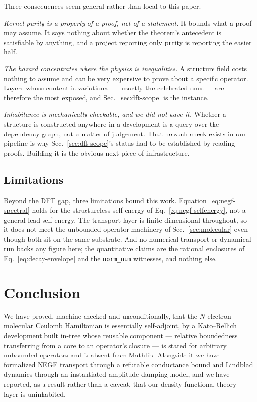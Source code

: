\documentclass[aps,prd,reprint,nofootinbib,superscriptaddress]{revtex4-2}
\begin{document}
Three consequences seem general rather than local to this paper.

\emph{Kernel purity is a property of a proof, not of a statement.} It bounds what a proof may assume.
It says nothing about whether the theorem's antecedent is satisfiable by anything, and a project
reporting only purity is reporting the easier half.

\emph{The hazard concentrates where the physics is inequalities.} A structure field costs nothing to
assume and can be very expensive to prove about a specific operator. Layers whose content is
variational --- exactly the celebrated ones --- are therefore the most exposed, and
Sec.~\ref{sec:dft-scope} is the instance.

\emph{Inhabitance is mechanically checkable, and we did not have it.} Whether a structure is
constructed anywhere in a development is a query over the dependency graph, not a matter of
judgement. That no such check exists in our pipeline is why Sec.~\ref{sec:dft-scope}'s status had to
be established by reading proofs. Building it is the obvious next piece of infrastructure.

\subsection{Limitations}

Beyond the DFT gap, three limitations bound this work. Equation~\eqref{eq:negf-spectral} holds for the
structureless self-energy of Eq.~\eqref{eq:negf-selfenergy}, not a general lead self-energy. The
transport layer is finite-dimensional throughout, so it does not meet the unbounded-operator
machinery of Sec.~\ref{sec:molecular} even though both sit on the same substrate. And no numerical
transport or dynamical run backs any figure here; the quantitative claims are the rational enclosures
of Eq.~\eqref{eq:decay-envelope} and the \texttt{norm\_num} witnesses, and nothing else.

\section{Conclusion}
\label{sec:conclusion}

We have proved, machine-checked and unconditionally, that the $N$-electron molecular Coulomb
Hamiltonian is essentially self-adjoint, by a Kato--Rellich development built in-tree whose reusable
component --- relative boundedness transferring from a core to an operator's closure --- is stated for
arbitrary unbounded operators and is absent from Mathlib. Alongside it we have formalized NEGF
transport through a refutable conductance bound and Lindblad dynamics through an instantiated
amplitude-damping model, and we have reported, as a result rather than a caveat, that our
density-functional-theory layer is uninhabited.
\end{document}
